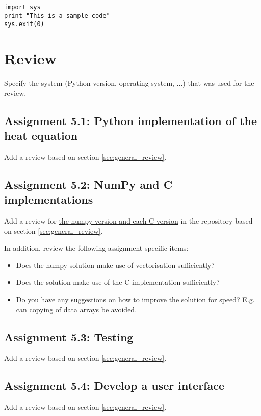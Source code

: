 \documentclass[a4paper]{article}
\begin{document}
\begin{verbatim}
import sys
print "This is a sample code"
sys.exit(0)
\end{verbatim}

\section{Review}\label{sec:review}

Specify the system (Python version, operating system, ...) that was used for the review.

\subsection*{Assignment 5.1:  Python implementation of the heat equation}
Add a review based on section \ref{sec:general_review}.


\subsection*{Assignment 5.2: NumPy and C implementations} \label{sec:assignment5.2}
Add a review for \underline{the numpy version and each C-version} in the repository based on section \ref{sec:general_review}.

In addition, review the following assignment specific items: 
\begin{itemize}
  \item Does the numpy solution make use of vectorisation sufficiently? 
  \item Does the solution make use of the C implementation sufficiently? 
  \item Do you have any suggestions on how to improve the solution for speed? E.g. can copying of data arrays be avoided.
\end{itemize}


\subsection*{Assignment 5.3: Testing}
Add a review based on section \ref{sec:general_review}.


\subsection*{Assignment 5.4:  Develop a user interface}
Add a review based on section \ref{sec:general_review}.
\end{document}
